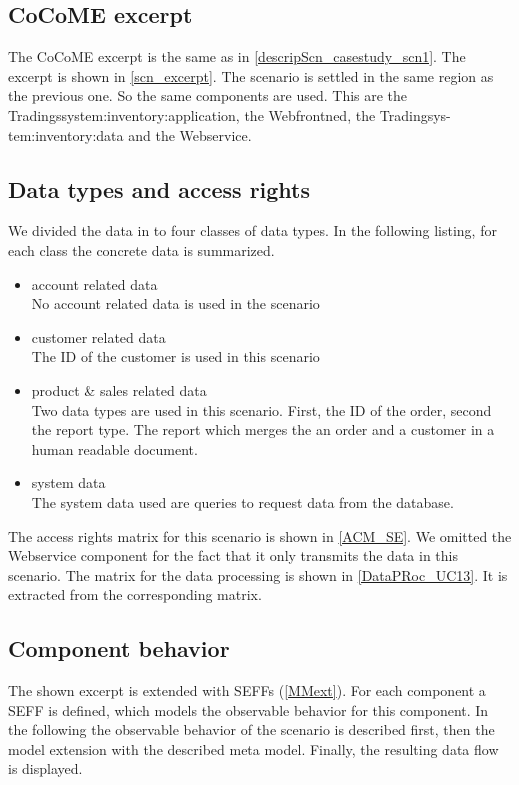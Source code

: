 \subsection{CoCoME excerpt}
The CoCoME excerpt is the same as in \autoref{descripScn_casestudy_scn1}. The excerpt is shown in \autoref{scn_excerpt}. The scenario is settled in the same region as the previous one. So the same components are used. This are the Tradingssystem:inventory:application, the Webfrontned, the Tradingsys-
tem:inventory:data and the Webservice.
\subsection{Data types and access rights}
We divided the data in to four classes of data types. In the following listing, for each class the concrete data is summarized.

\begin{itemize}
\item account related data \\ No account related data is used in the scenario 
\item customer related data \\ The ID of the customer is used in this scenario
\item product \& sales related data \\ Two data types are used in this scenario. First, the ID of the order, second the report type. The report which merges the an order and a customer in a human readable document. 
\item system data \\ The system data used are queries to request data from the database.
\end{itemize}
 

The access rights matrix for this scenario is shown in \autoref{ACM_SE}. We omitted the Webservice component for the fact that it only transmits the data in this scenario.
The matrix for the data processing is shown in \autoref{DataPRoc_UC13}. It is extracted from the corresponding matrix.
\subsection{Component behavior}
The shown excerpt is extended with SEFFs (\autoref{MMext}). For each component a SEFF
is defined, which models the observable behavior for this component. In the following the
observable behavior of the scenario is described first, then the model extension with the
described meta model. Finally, the resulting data flow is displayed.
